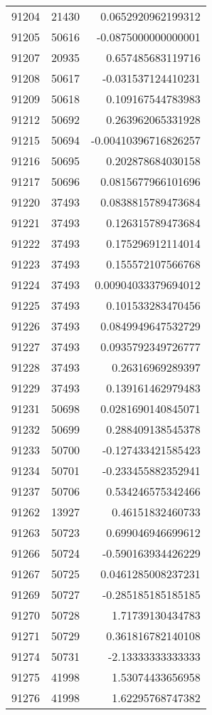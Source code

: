 \begin{tabular}{r | r | r}
91204 & 21430 & 0.0652920962199312 \\
91205 & 50616 & -0.0875000000000001 \\
91207 & 20935 & 0.657485683119716 \\
91208 & 50617 & -0.031537124410231 \\
91209 & 50618 & 0.109167544783983 \\
91212 & 50692 & 0.263962065331928 \\
91215 & 50694 & -0.00410396716826257 \\
91216 & 50695 & 0.202878684030158 \\
91217 & 50696 & 0.0815677966101696 \\
91220 & 37493 & 0.0838815789473684 \\
91221 & 37493 & 0.126315789473684 \\
91222 & 37493 & 0.175296912114014 \\
91223 & 37493 & 0.155572107566768 \\
91224 & 37493 & 0.00904033379694012 \\
91225 & 37493 & 0.101533283470456 \\
91226 & 37493 & 0.0849949647532729 \\
91227 & 37493 & 0.0935792349726777 \\
91228 & 37493 & 0.26316969289397 \\
91229 & 37493 & 0.139161462979483 \\
91231 & 50698 & 0.0281690140845071 \\
91232 & 50699 & 0.288409138545378 \\
91233 & 50700 & -0.127433421585423 \\
91234 & 50701 & -0.233455882352941 \\
91237 & 50706 & 0.534246575342466 \\
91262 & 13927 & 0.46151832460733 \\
91263 & 50723 & 0.699046946699612 \\
91266 & 50724 & -0.590163934426229 \\
91267 & 50725 & 0.0461285008237231 \\
91269 & 50727 & -0.285185185185185 \\
91270 & 50728 & 1.71739130434783 \\
91271 & 50729 & 0.361816782140108 \\
91274 & 50731 & -2.13333333333333 \\
91275 & 41998 & 1.53074433656958 \\
91276 & 41998 & 1.62295768747382 \\

\end{tabular}
